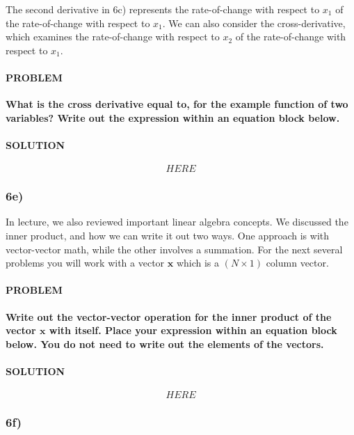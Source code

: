 \documentclass[]{article}
\let\oldparagraph\paragraph
\renewcommand{\paragraph}[1]{\oldparagraph{#1}\mbox{}}
\begin{document}
The second derivative in 6c) represents the rate-of-change with respect
to \(x_1\) of the rate-of-change with respect to \(x_1\). We can also
consider the cross-derivative, which examines the rate-of-change with
respect to \(x_2\) of the rate-of-change with respect to \(x_1\).

\hypertarget{problem-34}{%
\paragraph{PROBLEM}\label{problem-34}}

\textbf{What is the cross derivative equal to, for the example function
of two variables? Write out the expression within an equation block
below.}

\hypertarget{solution-33}{%
\paragraph{SOLUTION}\label{solution-33}}

\[ 
HERE
\]

\hypertarget{e-5}{%
\subsubsection{6e)}\label{e-5}}

In lecture, we also reviewed important linear algebra concepts. We
discussed the inner product, and how we can write it out two ways. One
approach is with vector-vector math, while the other involves a
summation. For the next several problems you will work with a vector
\(\mathbf{x}\) which is a \(\left(N \times 1\right)\) column vector.

\hypertarget{problem-35}{%
\paragraph{PROBLEM}\label{problem-35}}

\textbf{Write out the vector-vector operation for the inner product of
the vector \(\mathbf{x}\) with itself. Place your expression within an
equation block below. You do not need to write out the elements of the
vectors.}

\hypertarget{solution-34}{%
\paragraph{SOLUTION}\label{solution-34}}

\[ 
HERE
\]

\hypertarget{f-3}{%
\subsubsection{6f)}\label{f-3}}
\end{document}
